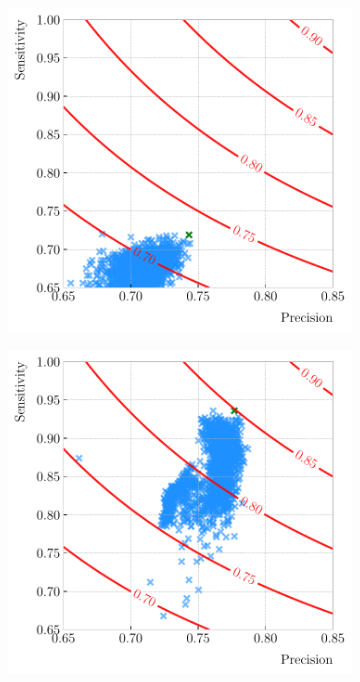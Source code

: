 \begin{figure}[t]
	\begin{subfigure}{0.32\textwidth}
		\centering
		\includegraphics[width=.99\linewidth]{Images/GArSoft_PID/BDT/precision_vs_sensitivity_p0_0.20_sigmap_0.10.pdf}
	\end{subfigure}
	\begin{subfigure}{0.32\textwidth}
		\centering
		\includegraphics[width=.99\linewidth]{Images/GArSoft_PID/BDT/precision_vs_sensitivity_p0_1.15_sigmap_0.35.pdf}

\end{subfigure}
\end{figure}
